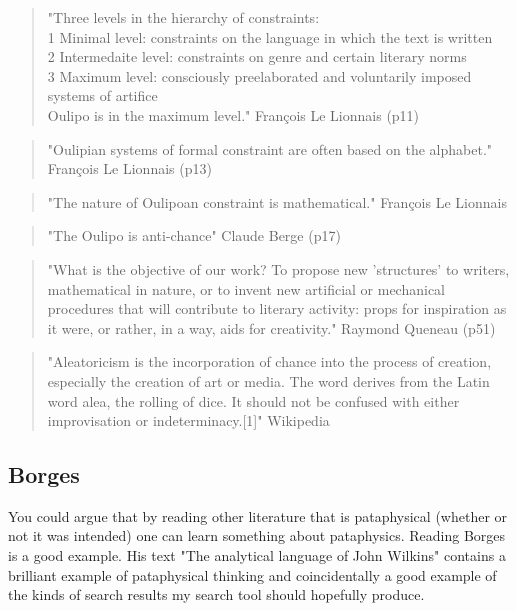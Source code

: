 \begin{quote}
  "Three levels in the hierarchy of constraints:\\1 Minimal level: constraints on the language in which the text is written\\2 Intermedaite level: constraints on genre and certain literary norms\\3 Maximum level: consciously preelaborated and voluntarily imposed systems of artifice\\Oulipo is in the maximum level." François Le Lionnais (p11)
\end{quote}

\begin{quote}
  "Oulipian systems of formal constraint are often based on the alphabet." François Le Lionnais (p13)
\end{quote}

\begin{quote}
  "The nature of Oulipoan constraint is mathematical." François Le Lionnais
\end{quote}

\begin{quote}
  "The Oulipo is anti-chance" Claude Berge (p17)
\end{quote}

\begin{quote}
  "What is the objective of our work? To propose new 'structures' to writers, mathematical in nature, or to invent new artificial or mechanical procedures that will contribute to literary activity: props for inspiration as it were, or rather, in a way, aids for creativity." Raymond Queneau (p51)
\end{quote}

\begin{quote}
  "Aleatoricism is the incorporation of chance into the process of creation, especially the creation of art or media. The word derives from the Latin word alea, the rolling of dice. It should not be confused with either improvisation or indeterminacy.[1]" Wikipedia
\end{quote}


\subsection{Borges}

You could argue that by reading other literature that is pataphysical (whether or not it was intended) one can learn something about pataphysics. Reading Borges \citep{Borges1964, Borges2004, Borges1957, Borges2010a, Borges2010b, Borges2000} is a good example. His text "The analytical language of John Wilkins" \citep{Borges2000} contains a brilliant example of pataphysical thinking and coincidentally a good example of the kinds of search results my search tool should hopefully produce.

